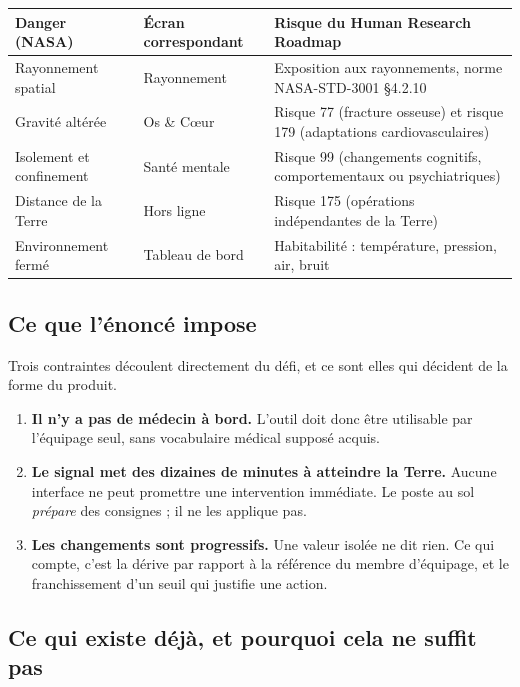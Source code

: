 \documentclass[11pt,a4paper]{article}
\begin{document}
\begin{tabularx}{\textwidth}{@{}L{4.1cm} L{4.2cm} X@{}}
\toprule
\textbf{Danger (NASA)} & \textbf{\'Ecran correspondant} & \textbf{Risque du Human Research Roadmap} \\
\midrule
Rayonnement spatial & Rayonnement & Exposition aux rayonnements, norme NASA-STD-3001 \S4.2.10 \\
Gravit\'e alt\'er\'ee & Os \& C\oe{}ur & Risque 77 (fracture osseuse) et risque 179 (adaptations cardiovasculaires) \\
Isolement et confinement & Sant\'e mentale & Risque 99 (changements cognitifs, comportementaux ou psychiatriques) \\
Distance de la Terre & Hors ligne & Risque 175 (op\'erations ind\'ependantes de la Terre) \\
Environnement ferm\'e & Tableau de bord & Habitabilit\'e : temp\'erature, pression, air, bruit \\
\bottomrule
\end{tabularx}

\subsection{Ce que l'\'enonc\'e impose}

Trois contraintes d\'ecoulent directement du d\'efi, et ce sont elles qui d\'ecident de la forme du
produit.

\begin{enumerate}
  \item \textbf{Il n'y a pas de m\'edecin \`a bord.} L'outil doit donc \^etre utilisable par
        l'\'equipage seul, sans vocabulaire m\'edical suppos\'e acquis.
  \item \textbf{Le signal met des dizaines de minutes \`a atteindre la Terre.} Aucune interface ne
        peut promettre une intervention imm\'ediate. Le poste au sol \emph{pr\'epare} des consignes ;
        il ne les applique pas.
  \item \textbf{Les changements sont progressifs.} Une valeur isol\'ee ne dit rien. Ce qui compte,
        c'est la d\'erive par rapport \`a la r\'ef\'erence du membre d'\'equipage, et le franchissement
        d'un seuil qui justifie une action.
\end{enumerate}

\subsection{Ce qui existe d\'ej\`a, et pourquoi cela ne suffit pas}
\end{document}
